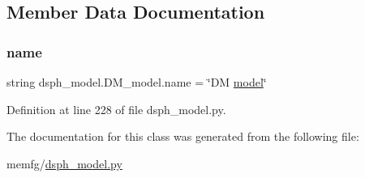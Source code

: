 \subsection{Member Data Documentation}
\mbox{\label{classdsph__model_1_1DM__model_adb4289b632a2ad76991047f359e9d649}} 
\subsubsection{\texorpdfstring{name}{name}}
{\footnotesize\ttfamily string dsph\+\_\+model.\+D\+M\+\_\+model.\+name = \char`\"{}DM \hyperlink{classdsph__model_1_1model}{model}\char`\"{}\hspace{0.3cm}{\ttfamily [static]}}



Definition at line 228 of file dsph\+\_\+model.\+py.



The documentation for this class was generated from the following file\+:\begin{DoxyCompactItemize}
\item 
memfg/\hyperlink{dsph__model_8py}{dsph\+\_\+model.\+py}\end{DoxyCompactItemize}

